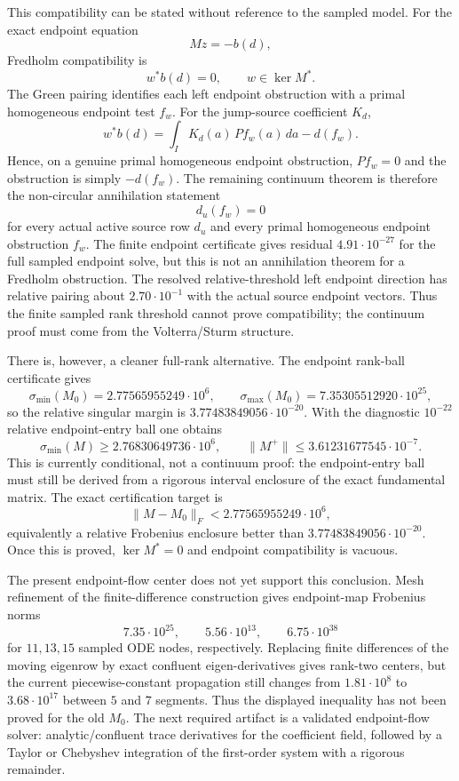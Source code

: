 \documentclass[11pt]{article}
\begin{document}
This compatibility can be stated without reference to the sampled model.  For
the exact endpoint equation
\[
  Mz=-b(d),
\]
Fredholm compatibility is
\[
  w^\ast b(d)=0,\qquad w\in\ker M^\ast .
\]
The Green pairing identifies each left endpoint obstruction with a primal
homogeneous endpoint test \(f_w\).  For the jump-source coefficient \(K_d\),
\[
  w^\ast b(d)
  =\int_I K_d(a)\,P f_w(a)\,da-d(f_w).
\]
Hence, on a genuine primal homogeneous endpoint obstruction, \(P f_w=0\) and
the obstruction is simply \(-d(f_w)\).  The remaining continuum theorem is
therefore the non-circular annihilation statement
\[
  d_u(f_w)=0
\]
for every actual active source row \(d_u\) and every primal homogeneous
endpoint obstruction \(f_w\).  The finite endpoint certificate gives residual
\(4.91\cdot10^{-27}\) for the full sampled endpoint solve, but this is not an
annihilation theorem for a Fredholm obstruction.  The resolved
relative-threshold left endpoint direction has relative pairing about
\(2.70\cdot10^{-1}\) with the actual source endpoint vectors.  Thus the finite
sampled rank threshold cannot prove compatibility; the continuum proof must
come from the Volterra/Sturm structure.

There is, however, a cleaner full-rank alternative.  The endpoint rank-ball
certificate gives
\[
  \sigma_{\min}(M_0)=2.77565955249\cdot10^6,\qquad
  \sigma_{\max}(M_0)=7.35305512920\cdot10^{25},
\]
so the relative singular margin is \(3.77483849056\cdot10^{-20}\).  With the
diagnostic \(10^{-22}\) relative endpoint-entry ball one obtains
\[
  \sigma_{\min}(M)\ge 2.76830649736\cdot10^6,\qquad
  \|M^+\|\le 3.61231677545\cdot10^{-7}.
\]
This is currently conditional, not a continuum proof: the endpoint-entry ball
must still be derived from a rigorous interval enclosure of the exact
fundamental matrix.  The exact certification target is
\[
  \|M-M_0\|_F < 2.77565955249\cdot10^6,
\]
equivalently a relative Frobenius enclosure better than
\(3.77483849056\cdot10^{-20}\).  Once this is proved, \(\ker M^\ast=0\) and
endpoint compatibility is vacuous.

The present endpoint-flow center does not yet support this conclusion.  Mesh
refinement of the finite-difference construction gives endpoint-map Frobenius
norms
\[
  7.35\cdot10^{25},\qquad 5.56\cdot10^{13},\qquad
  6.75\cdot10^{38}
\]
for \(11,13,15\) sampled ODE nodes, respectively.  Replacing finite
differences of the moving eigenrow by exact confluent eigen-derivatives gives
rank-two centers, but the current piecewise-constant propagation still changes
from \(1.81\cdot10^8\) to \(3.68\cdot10^{17}\) between \(5\) and \(7\)
segments.  Thus the displayed inequality has not been proved for the old
\(M_0\).  The next required artifact is a validated endpoint-flow solver:
analytic/confluent trace derivatives for the coefficient field, followed by a
Taylor or Chebyshev integration of the first-order system with a rigorous
remainder.
\end{document}
